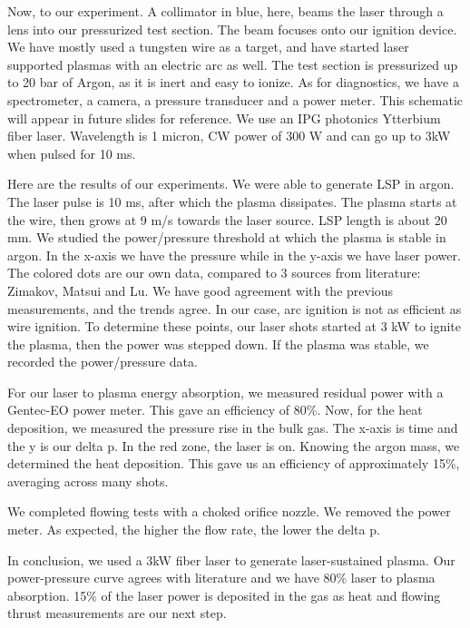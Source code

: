     Now, to our experiment. A collimator in blue, here, beams the laser through a lens into our pressurized test section. The beam focuses onto our ignition device. We have mostly used a tungsten wire as a target, and have started laser supported plasmas with an electric arc as well. The test section is pressurized up to 20 bar of Argon, as it is inert and easy to ionize. As for diagnostics, we have a spectrometer, a camera, a pressure transducer and a power meter. This schematic will appear in future slides for reference. We use an IPG photonics Ytterbium fiber laser. Wavelength is 1 micron, CW power of 300 W and can go up to 3kW when pulsed for 10 ms.

    Here are the results of our experiments. We were able to generate LSP in argon. The laser pulse is 10 ms, after which the plasma dissipates. The plasma starts at the wire, then grows at 9 m/s towards the laser source. LSP length is about 20 mm. We studied the power/pressure threshold at which the plasma is stable in argon. In the x-axis we have the pressure while in the y-axis we have laser power. The colored dots are our own data, compared to 3 sources from literature: Zimakov, Matsui and Lu. We have good agreement with the previous measurements, and the trends agree. In our case, arc ignition is not as efficient as wire ignition. To determine these points, our laser shots started at 3 kW to ignite the plasma, then the power was stepped down. If the plasma was stable, we recorded the power/pressure data.

    For our laser to plasma energy absorption, we measured residual power with a Gentec-EO power meter. This gave an efficiency of 80\%. Now, for the heat deposition, we measured the pressure rise in the bulk gas. The x-axis is time and the y is our delta p. In the red zone, the laser is on. Knowing the argon mass, we determined the heat deposition. This gave us an efficiency of approximately 15\%, averaging across many shots.

    We completed flowing tests with a choked orifice nozzle. We removed the power meter. As expected, the higher the flow rate, the lower the delta p.

    In conclusion, we used a 3kW fiber laser to generate laser-sustained plasma. Our power-pressure curve agrees with literature and we have 80\% laser to plasma absorption. 15\% of the laser power is deposited in the gas as heat and flowing thrust measurements are our next step.